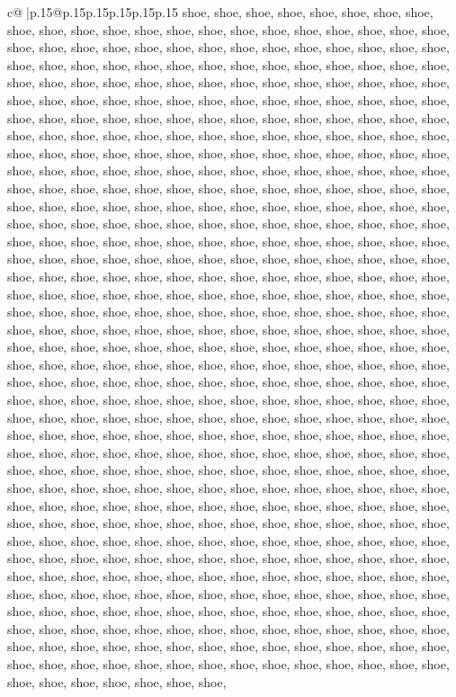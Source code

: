\documentclass{article}
\begin{document}
{\begin{supertabular}{c@{$\;$}|p{.15\linewidth}@{}p{.15\linewidth}p{.15\linewidth}p{.15\linewidth}p{.15\linewidth}p{.15\linewidth}}
{{{shoe, shoe, shoe, shoe, shoe, shoe, shoe, shoe, shoe, shoe, shoe, shoe, shoe, shoe, shoe, shoe, shoe, shoe, shoe, shoe, shoe, shoe, shoe, shoe, shoe, shoe, shoe, shoe, shoe, shoe, shoe, shoe, shoe, shoe, shoe, shoe, shoe, shoe, shoe, shoe, shoe, shoe, shoe, shoe, shoe, shoe, shoe, shoe, shoe, shoe, shoe, shoe, shoe, shoe, shoe, shoe, shoe, shoe, shoe, shoe, shoe, shoe, shoe, shoe, shoe, shoe, shoe, shoe, shoe, shoe, shoe, shoe, shoe, shoe, shoe, shoe, shoe, shoe, shoe, shoe, shoe, shoe, shoe, shoe, shoe, shoe, shoe, shoe, shoe, shoe, shoe, shoe, shoe, shoe, shoe, shoe, shoe, shoe, shoe, shoe, shoe, shoe, shoe, shoe, shoe, shoe, shoe, shoe, shoe, shoe, shoe, shoe, shoe, shoe, shoe, shoe, shoe, shoe, shoe, shoe, shoe, shoe, shoe, shoe, shoe, shoe, shoe, shoe, shoe, shoe, shoe, shoe, shoe, shoe, shoe, shoe, shoe, shoe, shoe, shoe, shoe, shoe, shoe, shoe, shoe, shoe, shoe, shoe, shoe, shoe, shoe, shoe, shoe, shoe, shoe, shoe, shoe, shoe, shoe, shoe, shoe, shoe, shoe, shoe, shoe, shoe, shoe, shoe, shoe, shoe, shoe, shoe, shoe, shoe, shoe, shoe, shoe, shoe, shoe, shoe, shoe, shoe, shoe, shoe, shoe, shoe, shoe, shoe, shoe, shoe, shoe, shoe, shoe, shoe, shoe, shoe, shoe, shoe, shoe, shoe, shoe, shoe, shoe, shoe, shoe, shoe, shoe, shoe, shoe, shoe, shoe, shoe, shoe, shoe, shoe, shoe, shoe, shoe, shoe, shoe, shoe, shoe, shoe, shoe, shoe, shoe, shoe, shoe, shoe, shoe, shoe, shoe, shoe, shoe, shoe, shoe, shoe, shoe, shoe, shoe, shoe, shoe, shoe, shoe, shoe, shoe, shoe, shoe, shoe, shoe, shoe, shoe, shoe, shoe, shoe, shoe, shoe, shoe, shoe, shoe, shoe, shoe, shoe, shoe, shoe, shoe, shoe, shoe, shoe, shoe, shoe, shoe, shoe, shoe, shoe, shoe, shoe, shoe, shoe, shoe, shoe, shoe, shoe, shoe, shoe, shoe, shoe, shoe, shoe, shoe, shoe, shoe, shoe, shoe, shoe, shoe, shoe, shoe, shoe, shoe, shoe, shoe, shoe, shoe, shoe, shoe, shoe, shoe, shoe, shoe, shoe, shoe, shoe, shoe, shoe, shoe, shoe, shoe, shoe, shoe, shoe, shoe, shoe, shoe, shoe, shoe, shoe, shoe, shoe, shoe, shoe, shoe, shoe, shoe, shoe, shoe, shoe, shoe, shoe, shoe, shoe, shoe, shoe, shoe, shoe, shoe, shoe, shoe, shoe, shoe, shoe, shoe, shoe, shoe, shoe, shoe, shoe, shoe, shoe, shoe, shoe, shoe, shoe, shoe, shoe, shoe, shoe, shoe, shoe, shoe, shoe, shoe, shoe, shoe, shoe, shoe, shoe, shoe, shoe, shoe, shoe, shoe, shoe, shoe, shoe, shoe, shoe, shoe, shoe, shoe, shoe, shoe, shoe, shoe, shoe, shoe, shoe, shoe, shoe, shoe, shoe, shoe, shoe, shoe, shoe, shoe, shoe, shoe, shoe, shoe, shoe, shoe, shoe, shoe, shoe, shoe, shoe, shoe, shoe, shoe, shoe, shoe, shoe, shoe, shoe, shoe, shoe, shoe, shoe, shoe, shoe, shoe, shoe, shoe, shoe, shoe, shoe, shoe, shoe, shoe, shoe, shoe, shoe, shoe, shoe, shoe, shoe, shoe, shoe, shoe, shoe, shoe, shoe, shoe, shoe, shoe, shoe, shoe, shoe, shoe, shoe, shoe, shoe, shoe, shoe, shoe, shoe, shoe, shoe, shoe, shoe, shoe, shoe, shoe, shoe, shoe, shoe, shoe, shoe, shoe, shoe, shoe, shoe, shoe, shoe, shoe, shoe, shoe, shoe, shoe, shoe, shoe, shoe, shoe, shoe, shoe, shoe, shoe, shoe, shoe, shoe, shoe, shoe, shoe, shoe, shoe, shoe, shoe, shoe, shoe, shoe, shoe, shoe, shoe, shoe, shoe, shoe, shoe, shoe, shoe, shoe, shoe, shoe, shoe, shoe, shoe, shoe, shoe, shoe, shoe, shoe, shoe, shoe, }}}
\end{supertabular}}
\end{document}

